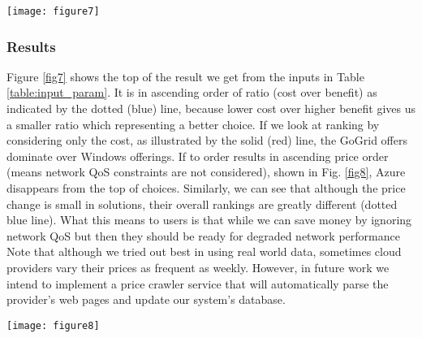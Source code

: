 \documentclass[journal]{IEEEtran}
\begin{document}
\begin{figure*}[!htp]
 \centering
 \texttt{[image: figure7]}
 \caption{Results in ascending order by (cost / benefit) ratio}
\label{fig7}
\end{figure*}


\subsubsection{Results}

Figure \ref{fig7} shows the top  of the result we get from the inputs in Table \ref{table:input_param}. It is in ascending order of ratio (cost over benefit) as indicated by the dotted (blue) line, because lower cost over higher benefit gives us a smaller ratio which representing a better choice.  If we look at ranking by considering only the cost, as illustrated by the solid (red) line, the GoGrid offers dominate over Windows offerings. If to order results in ascending price order (means network QoS constraints are not considered), shown in Fig. \ref{fig8}, Azure disappears from the top  of choices. Similarly, we can see that although the price change is small in solutions, their overall rankings are greatly different (dotted blue line). What this means to users is that while we can save money by ignoring network QoS but then they should be ready for degraded network performance Note that although we tried out best in using real world data, sometimes cloud providers vary their prices as frequent as weekly. However, in future work we intend to implement a price crawler service that will automatically parse the provider's web pages and update our system's database.
\begin{figure*}[!htp]
 \centering
 \texttt{[image: figure8]}
 \caption{Results in ascending order by cost}
\label{fig8}
\end{figure*}
\end{document}
